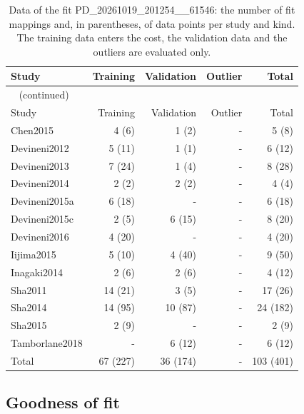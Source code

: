 \begin{longtable}{lrrrr}
\caption{Data of the fit PD\_20261019\_201254\_\_61546: the number of fit mappings and, in parentheses, of data points per study and kind. The training data enters the cost, the validation data and the outliers are evaluated only.}\label{tab:data:PD_20261019_201254__61546} \\
\toprule
Study & Training & Validation & Outlier & Total \\
\midrule
\endfirsthead
\multicolumn{5}{l}{\small\tablename~\thetable{} (continued)} \\
\toprule
Study & Training & Validation & Outlier & Total \\
\midrule
\endhead
\bottomrule
\endlastfoot
Chen2015 & 4 (6) & 1 (2) & - & 5 (8) \\
Devineni2012 & 5 (11) & 1 (1) & - & 6 (12) \\
Devineni2013 & 7 (24) & 1 (4) & - & 8 (28) \\
Devineni2014 & 2 (2) & 2 (2) & - & 4 (4) \\
Devineni2015a & 6 (18) & - & - & 6 (18) \\
Devineni2015c & 2 (5) & 6 (15) & - & 8 (20) \\
Devineni2016 & 4 (20) & - & - & 4 (20) \\
Iijima2015 & 5 (10) & 4 (40) & - & 9 (50) \\
Inagaki2014 & 2 (6) & 2 (6) & - & 4 (12) \\
Sha2011 & 14 (21) & 3 (5) & - & 17 (26) \\
Sha2014 & 14 (95) & 10 (87) & - & 24 (182) \\
Sha2015 & 2 (9) & - & - & 2 (9) \\
Tamborlane2018 & - & 6 (12) & - & 6 (12) \\
Total & 67 (227) & 36 (174) & - & 103 (401) \\
\end{longtable}

\subsection{Goodness of fit}

